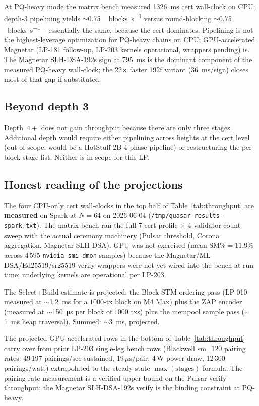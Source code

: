 At PQ-heavy mode the matrix bench measured \SI{1326}{\milli\second}
cert wall-clock on CPU; depth-3 pipelining yields
$\sim$\SI{0.75}{\,blocks\per\second} versus round-blocking
$\sim$\SI{0.75}{\,blocks\per\second} -- essentially the same,
because the cert dominates. Pipelining is not the highest-leverage
optimization for PQ-heavy chains on CPU; GPU-accelerated Magnetar
(LP-181 follow-up, LP-203 kernels operational, wrappers pending)
is. The Magnetar SLH-DSA-192s sign at \SI{795}{\milli\second} is
the dominant component of the measured PQ-heavy wall-clock; the
22$\times$ faster 192f variant (\SI{36}{\milli\second}/sign) closes
most of that gap if substituted.

\subsection{Beyond depth 3}

Depth~$4{+}$ does not gain throughput because there are only three
stages. Additional depth would require either pipelining across
heights at the cert level (out of scope; would be a HotStuff-2B
4-phase pipeline) or restructuring the per-block stage list.
Neither is in scope for this LP.

\subsection{Honest reading of the projections}

The four CPU-only cert wall-clocks in the top half of
Table~\ref{tab:throughput} are \textbf{measured} on Spark at
$N{=}64$ on 2026-06-04 (\texttt{/tmp/quasar-results-spark.txt}).
The matrix bench ran the full 7-cert-profile $\times$ 4-validator-count
sweep with the actual ceremony machinery (Pulsar threshold,
Corona aggregation, Magnetar SLH-DSA). GPU was not exercised
(mean SM\%${=}11.9\%$ across 4\,595 \texttt{nvidia-smi dmon}
samples) because the Magnetar/ML-DSA/Ed25519/sr25519 verify
wrappers were not yet wired into the bench at run time;
underlying kernels are operational per LP-203.

The Select+Build estimate is projected: the Block-STM ordering pass
(LP-010 measured at $\sim$\SI{1.2}{\milli\second} for a $1000$-tx
block on M4 Max) plus the ZAP encoder (measured at
$\sim$\SI{150}{\micro\second} per block of $1000$ txs) plus the
mempool sample pass ($\sim$\SI{1}{\milli\second} heap traversal).
Summed: $\sim$\SI{3}{\milli\second}, projected.

The projected GPU-accelerated rows in the bottom of
Table~\ref{tab:throughput} carry over from prior LP-203 single-leg
bench rows (Blackwell sm\_120 pairing rates: 49\,197 pairings/sec
sustained, 19\,$\mu$s/pair, 4\,W power draw, 12\,300 pairings/watt)
extrapolated to the steady-state $\max(\textrm{stages})$ formula.
The pairing-rate measurement is a verified upper bound on the
Pulsar verify throughput; the Magnetar SLH-DSA-192s verify is the
binding constraint at PQ-heavy.

